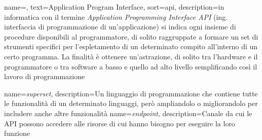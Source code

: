 
\renewcommand{\acronymname}{Acronimi e abbreviazioni}











{
    name=,
    text=Application Program Interface,
    sort=api,
    description={in informatica con il termine \emph{Application Programming Interface API} (ing. interfaccia di programmazione di un'applicazione) si indica ogni insieme di procedure disponibili al programmatore, di solito raggruppate a formare un set di strumenti specifici per l'espletamento di un determinato compito all'interno di un certo programma. La finalità è ottenere un'astrazione, di solito tra l'hardware e il programmatore o tra software a basso e quello ad alto livello semplificando così il lavoro di programmazione}
}

{
    name=\textit{superset},
    description={Un linguaggio di programmazione che contiene tutte le funzionalità di un determinato linguaggi, però ampliandolo o migliorandolo per includere anche altre funzionalità}
}
{
    name=\textit{endpoint},
    description={Canale da cui le \gls{API} possono accedere alle risorse di cui hanno bisogno per eseguire la loro funzione}
}


